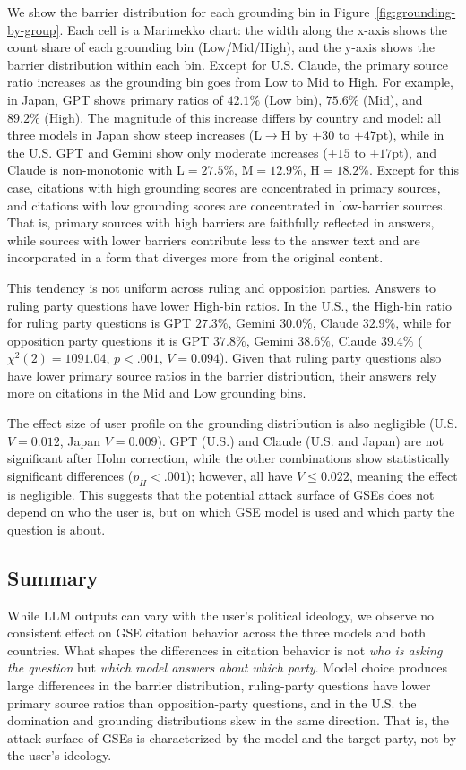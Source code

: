 We show the barrier distribution for each grounding bin in Figure~\ref{fig:grounding-by-group}.
Each cell is a Marimekko chart: the width along the x-axis shows the count share of each grounding bin (Low/Mid/High), and the y-axis shows the barrier distribution within each bin.
Except for U.S. Claude, the primary source ratio increases as the grounding bin goes from Low to Mid to High.
For example, in Japan, GPT shows primary ratios of $42.1\%$ (Low bin), $75.6\%$ (Mid), and $89.2\%$ (High).
The magnitude of this increase differs by country and model: all three models in Japan show steep increases (L$\to$H by ${+}30$ to ${+}47$pt), while in the U.S. GPT and Gemini show only moderate increases (${+}15$ to ${+}17$pt), and Claude is non-monotonic with L$=27.5\%$, M$=12.9\%$, H$=18.2\%$.
Except for this case, citations with high grounding scores are concentrated in primary sources, and citations with low grounding scores are concentrated in low-barrier sources.
That is, primary sources with high barriers are faithfully reflected in answers, while sources with lower barriers contribute less to the answer text and are incorporated in a form that diverges more from the original content.

This tendency is not uniform across ruling and opposition parties.
Answers to ruling party questions have lower High-bin ratios.
In the U.S., the High-bin ratio for ruling party questions is GPT $27.3\%$, Gemini $30.0\%$, Claude $32.9\%$, while for opposition party questions it is GPT $37.8\%$, Gemini $38.6\%$, Claude $39.4\%$ ($\chi^2(2) = 1091.04,\, p < .001,\, V = 0.094$).
Given that ruling party questions also have lower primary source ratios in the barrier distribution, their answers rely more on citations in the Mid and Low grounding bins.

The effect size of user profile on the grounding distribution is also negligible (U.S. $V = 0.012$, Japan $V = 0.009$).
GPT (U.S.) and Claude (U.S. and Japan) are not significant after Holm correction, while the other combinations show statistically significant differences ($p_H < .001$); however, all have $V \leq 0.022$, meaning the effect is negligible.
This suggests that the potential attack surface of GSEs does not depend on who the user is, but on which GSE model is used and which party the question is about.

\subsection{Summary}
While LLM outputs can vary with the user's political ideology, we observe no consistent effect on GSE citation behavior across the three models and both countries.
What shapes the differences in citation behavior is not \emph{who is asking the question} but \emph{which model answers about which party}.
Model choice produces large differences in the barrier distribution, ruling-party questions have lower primary source ratios than opposition-party questions, and in the U.S. the domination and grounding distributions skew in the same direction.
That is, the attack surface of GSEs is characterized by the model and the target party, not by the user's ideology.